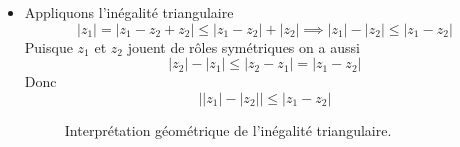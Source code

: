 \documentclass{article}
\renewenvironment{question_kholle}[2][ ]
{
	\subsection{\texorpdfstring{#2}{}}
	\notblank{#1}
	{
		\noindent #1
		\bigbreak
	}
	{}
	\begin{proof}
}
{
	\end{proof}
}
\begin{document}
\begin{question_kholle}
\begin{itemize}[label=$\lozenge$]
		\item Appliquons l'inégalité triangulaire
		      $$
			      \lvert  z_{1} \rvert  = \lvert z_{1} - z_{2} + z_{2} \rvert  \leqslant \lvert z_{1}-z_{2} \rvert +\lvert z_{2} \rvert  \implies \lvert z_{1} \rvert - \lvert z_{2} \rvert \leqslant \lvert z_{1}-z_{2} \rvert
		      $$
		      Puisque $z_{1}$ et $z_{2}$ jouent de rôles symétriques on a aussi
		      $$
			      \lvert z_{2} \rvert - \lvert z_{1} \rvert \leqslant \lvert z_{2}-z_{1} \rvert =\lvert z_{1}-z_{2} \rvert
		      $$
		      Donc
		      $$
			      \bigg| \lvert z_{1} \rvert-\lvert z_{2} \rvert \bigg|\leqslant \lvert z_{1}-z_{2} \rvert
		      $$
		      \begin{figure}[H]
			      \centering
			      \caption{Interprétation géométrique de l'inégalité triangulaire.}
		      \end{figure}
	\end{itemize}

\end{question_kholle}
\end{document}
